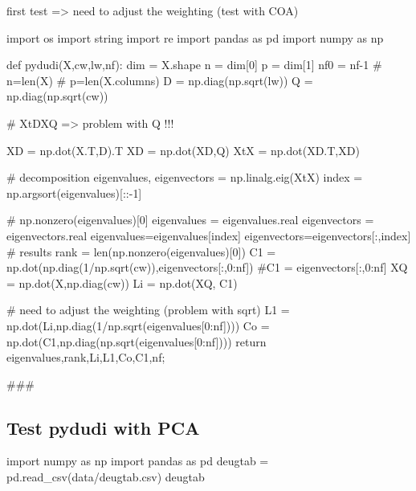 \documentclass[
  10pt,
]{article}
\newenvironment{Shaded}{\begin{snugshade}}{\end{snugshade}}
\newcommand{\NormalTok}[1]{#1}
\begin{document}
first test =\textgreater{} need to adjust the weighting (test with COA)

\begin{Shaded}
\begin{Highlighting}[]
\NormalTok{import os}
\NormalTok{import string}
\NormalTok{import re}
\NormalTok{import pandas as pd}
\NormalTok{import numpy as np}

\NormalTok{def pydudi(X,cw,lw,nf):}
\NormalTok{  dim = X.shape}
\NormalTok{  n = dim[0]}
\NormalTok{  p = dim[1]}
\NormalTok{  nf0 = nf{-}1}
\NormalTok{  \# n=len(X)}
\NormalTok{  \# p=len(X.columns)}
\NormalTok{  D = np.diag(np.sqrt(lw))}
\NormalTok{  Q = np.diag(np.sqrt(cw))}
  
\NormalTok{  \# XtDXQ =\textgreater{} problem  with Q !!!}
  
\NormalTok{  XD = np.dot(X.T,D).T}
\NormalTok{  XD = np.dot(XD,Q)}
\NormalTok{  XtX = np.dot(XD.T,XD)}
  
  
\NormalTok{  \# decomposition}
\NormalTok{  eigenvalues, eigenvectors = np.linalg.eig(XtX)}
\NormalTok{  index = np.argsort(eigenvalues)[::{-}1]}
  
\NormalTok{  \# np.nonzero(eigenvalues)[0]}
\NormalTok{  eigenvalues = eigenvalues.real}
\NormalTok{  eigenvectors = eigenvectors.real}
\NormalTok{  eigenvalues=eigenvalues[index]}
\NormalTok{  eigenvectors=eigenvectors[:,index]}
\NormalTok{  \# results}
\NormalTok{  rank = len(np.nonzero(eigenvalues)[0])}
\NormalTok{  C1 = np.dot(np.diag(1/np.sqrt(cw)),eigenvectors[:,0:nf])}
\NormalTok{  \#C1 = eigenvectors[:,0:nf]}
\NormalTok{  XQ = np.dot(X,np.diag(cw))}
\NormalTok{  Li = np.dot(XQ, C1)}
  
\NormalTok{  \# need to adjust the weighting (problem with sqrt)}
\NormalTok{  L1 = np.dot(Li,np.diag(1/np.sqrt(eigenvalues[0:nf])))}
\NormalTok{  Co = np.dot(C1,np.diag(np.sqrt(eigenvalues[0:nf])))}
\NormalTok{  return eigenvalues,rank,Li,L1,Co,C1,nf;}

\NormalTok{\#\#\#}
\end{Highlighting}
\end{Shaded}

\subsection{Test pydudi with PCA}\label{test-pydudi-with-pca}

\begin{Shaded}
\begin{Highlighting}[]
\NormalTok{import numpy as np }
\NormalTok{import pandas as pd}
\NormalTok{deugtab = pd.read\_csv(\textquotesingle{}data/deugtab.csv\textquotesingle{})}
\NormalTok{deugtab}
\end{Highlighting}
\end{Shaded}
\end{document}

